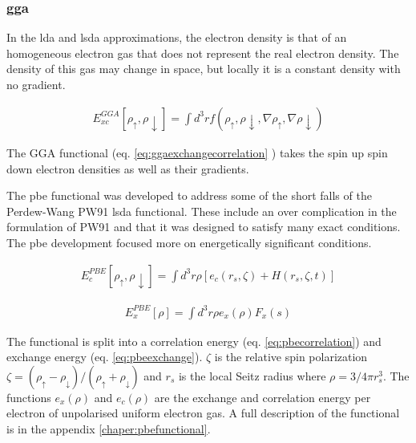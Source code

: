 \subsubsection{\acrshort{gga}}

In the \acrshort{lda} and \acrshort{lsda} approximations, the electron density is that of an homogeneous electron gas that does not represent the real electron density.  The density of this gas may change in space, but locally it is a constant density with no gradient.

\begin{equation}
\begin{split}
E_{xc}^{GGA} [\rho_{\uparrow}, \rho{\downarrow}] = \int d^3r f(\rho_{\uparrow}, \rho{\downarrow}, \nabla \rho_{\uparrow}, \nabla \rho{\downarrow})
\end{split}
\label{eq:ggaexchangecorrelation}
\end{equation}

The GGA functional (eq. \ref{eq:ggaexchangecorrelation} \cite{ldaggaperdew}) takes the spin up spin down electron densities as well as their gradients.  

The \acrshort{pbe} functional was developed to address some of the short falls of the Perdew-Wang PW91 \acrshort{lsda} functional.  These include an over complication in the formulation of PW91 and that it was designed to satisfy many exact conditions.  The \acrshort{pbe} development focused more on energetically significant conditions\cite{perdewggamadesimple}.

\begin{equation}
\begin{split}
E_{c}^{PBE} [\rho_{\uparrow}, \rho{\downarrow}] = \int d^3r \rho[e_c (r_s, \zeta) + H(r_s, \zeta, t)] 
\end{split}
\label{eq:pbecorrelation}
\end{equation}

\begin{equation}
\begin{split}
E_{x}^{PBE} [\rho] = \int d^3r \rho e_x(\rho) F_x(s)
\end{split}
\label{eq:pbeexchange}
\end{equation}

The functional is split into a correlation energy (eq. \ref{eq:pbecorrelation}) and exchange energy (eq. \ref{eq:pbeexchange}).  $\zeta$ is the relative spin polarization $\zeta = (\rho_{\uparrow}-\rho_{\downarrow})/(\rho_{\uparrow} + \rho_{\downarrow})$ and $r_s$ is the local Seitz radius where $\rho = 3/4 \pi r_s^3$.  The functions $e_x(\rho)$ and $e_c(\rho)$ are the exchange and correlation energy per electron of unpolarised uniform electron gas\cite{ldaggaperdew}.  A full description of the functional is in the appendix \ref{chaper:pbefunctional}.


